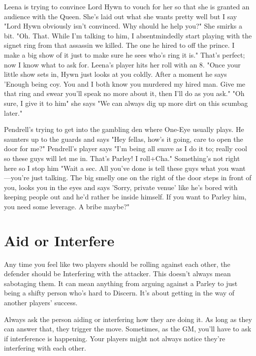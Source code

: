  
\startExample
Leena is trying to convince Lord Hywn to vouch for her so that she is granted an audience with the Queen. She's laid out what she wants pretty well but I say "Lord Hywn obviously isn't convinced. Why should he help you?" She smirks a bit. "Oh. That. While I'm talking to him, I absentmindedly start playing with the signet ring from that assassin we killed. The one he hired to off the prince. I make a big show of it just to make sure he sees who's ring it is." That's perfect; now I know what to ask for. Leena's player hits her roll with an 8. "Once your little show sets in, Hywn just looks at you coldly. After a moment he says 'Enough being coy. You and I both know you murdered my hired man. Give me that ring and swear you'll speak no more about it, then I'll do as you ask." "Oh sure, I give it to him" she says "We can always dig up more dirt on this scumbag later."
\stopExample
 
\startExample
Pendrell's trying to get into the gambling den where One-Eye usually plays. He saunters up to the guards and says "Hey fellas, how's it going, care to open the door for me?" Pendrell's player says "I'm being all suave as I do it to; really cool so these guys will let me in. That's Parley! I roll+Cha." Something's not right here so I stop him "Wait a sec. All you've done is tell these guys what you want—you're just talking. The big smelly one on the right of the door steps in front of you, looks you in the eyes and says 'Sorry, private venue' like he's bored with keeping people out and he'd rather be inside himself. If you want to Parley him, you need some leverage. A bribe maybe?"
\stopExample
 
\section{Aid or Interfere}    
 

Any time you feel like two players should be rolling against each other, the defender should be Interfering with the attacker. This doesn't always mean sabotaging them. It can mean anything from arguing against a Parley to just being a shifty person who's hard to Discern. It's about getting in the way of another players' success.

 

Always ask the person aiding or interfering how they are doing it. As long as they can answer that, they trigger the move. Sometimes, as the GM, you'll have to ask if interference is happening. Your players might not always notice they're interfering with each other.

